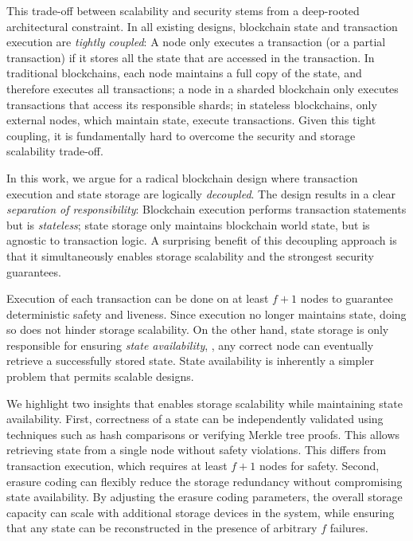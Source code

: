 This trade-off between scalability and security stems from a deep-rooted architectural constraint.
In all existing designs, blockchain state and transaction execution are \emph{tightly coupled}:
A node only executes a transaction (or a partial transaction) if it stores all the state that are accessed in the transaction.
In traditional blockchains, each node maintains a full copy of the state, and therefore executes all transactions;
a node in a sharded blockchain only executes transactions that access its responsible shards;
in stateless blockchains, only external nodes, which maintain state, execute transactions.
Given this tight coupling, it is fundamentally hard to overcome the security and storage scalability trade-off.

In this work, we argue for a radical blockchain design where transaction execution and state storage are logically \emph{decoupled}.
The design results in a clear \emph{separation of responsibility}: Blockchain execution performs transaction statements but is \emph{stateless}; state storage only maintains blockchain world state, but is agnostic to transaction logic.
A surprising benefit of this decoupling approach is that it simultaneously enables storage scalability and the strongest security guarantees.

Execution of each transaction can be done on at least $f+1$ nodes to guarantee deterministic safety and liveness.
Since execution no longer maintains state, doing so does not hinder storage scalability.
On the other hand, state storage is only responsible for ensuring \emph{state availability}, \ie, any correct node can eventually retrieve a successfully stored state.
State availability is inherently a simpler problem that permits scalable designs.

We highlight two insights that enables storage scalability while maintaining state availability.
First, correctness of a state can be independently validated using techniques such as hash comparisons or verifying Merkle tree proofs.
This allows retrieving state from a single node without safety violations.
This differs from transaction execution, which requires at least $f+1$ nodes for safety.
Second, erasure coding can flexibly reduce the storage redundancy without compromising state availability.
By adjusting the erasure coding parameters, the overall storage capacity can scale with additional storage devices in the system, while ensuring that any state can be reconstructed in the presence of arbitrary $f$ failures.

